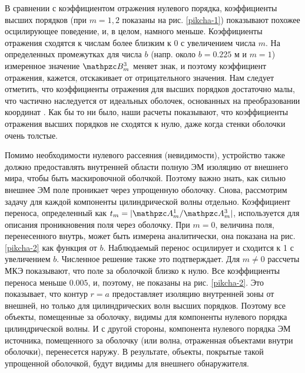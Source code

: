 \documentclass[12pt]{article}
\begin{document}
В сравнении с коэффициентом отражения нулевого порядка, коэффициенты
высших порядков (при $m = 1, 2$ показаны на рис. \ref{pikcha-1})
показывают похожее осцилирующее поведение, и, в целом, намного
меньше. Коэффициенты отражения сходятся к числам более близким к $0$ с
увеличением числа $m$. На определенных промежутках для числа $b$
(напр. около $b = 0.225$ м и $m = 1$) измеренное значение $\mathpzc
B_m^3$ меняет знак, и поэтому коэффициент отражения, кажется,
отскакивает от отрицательного значения. Нам следует отметить, что
коэффициенты отражения для высших порядков достаточно малы, что
частично наследуется от идеальных оболочек, основанных на
преобразовании координат \cite{15}. Как бы то ни было, наши расчеты показывают,
что коэффициенты отражения высших порядков не сходятся к нулю, даже
когда стенки оболочки очень толстые.

Помимо необходимости нулевого рассеяния (невидимости), устройство
также должно предоставлять внутренней области полную ЭМ изоляцию от
внешнего мира, чтобы быть маскировочной оболчкой. Поэтому важно знать,
как сильно внешнее ЭМ поле проникает через упрощенную оболочку. Снова,
рассмотрим задачу для каждой компоненты цилиндрической волны отдельно.
Коэффициент переноса, определенный как $t_m = |\mathpzc A_m^1 /
\mathpzc A_m^3|$, используется для описания проникновения поля через
оболочку. При $m = 0$, величина поля, перенесенного внутрь, может быть
измерена аналитически, она показана на рис. \ref{pikcha-2} как функция
от $b$. Наблюдаемый перенос осцилирует и сходится к 1 с увеличением
$b$. Численное решение также это подтверждает. Для $m \ne 0$ рассчеты
МКЭ показывают, что поле за оболочкой близко к нулю. Все коэффициенты
переноса меньше $0.005$, и, поэтому, не показаны на
рис. \ref{pikcha-2}. Это показывает, что контур $r = a$ предоставляет
изоляцию внутренней зоны от внешней, но только для цилиндрических волн
высших порядков. Поэтому все объекты, помещенные за оболочку, видимы
для компоненты нулевого порядка цилиндрической волны. И с другой
стороны, компонента нулевого порядка ЭМ источника, помещенного за
оболочку (или волна, отраженная объектами внутри оболочки),
перенесется наружу. В результате, объекты, покрытые такой упрощенной
оболочкой, будут видимы для внешнего обнаружителя.
\end{document}

